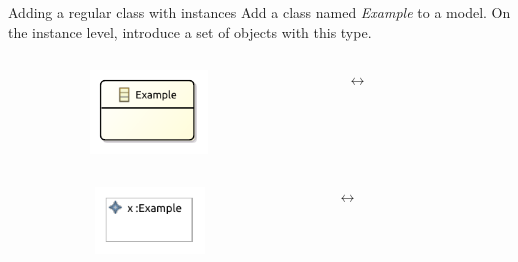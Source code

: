 \begin{frame}{Adding a regular class with instances}
Add a class named \textit{Example} to a model. On the instance level, introduce a set of objects with this type.
\begin{columns}[c]
    \begin{column}{0.05\textwidth}
    \end{column}\begin{column}{0.45\textwidth}
        \centering
        \includegraphics[width=0.5\textwidth]{images/04_library_of_transformations/class_type.pdf}
    \end{column}\begin{column}{0.05\textwidth}
        \centering
        $\leftrightarrow$
    \end{column}\begin{column}{0.45\textwidth}
        \centering
        
    \end{column}
\end{columns}
\begin{columns}[c]
    \begin{column}{0.05\textwidth}
    \end{column}\begin{column}{0.45\textwidth}
        \centering
        \includegraphics[width=0.5\textwidth]{images/04_library_of_transformations/class_instance.pdf}
    \end{column}\begin{column}{0.05\textwidth}
        \centering
        $\leftrightarrow$
    \end{column}\begin{column}{0.45\textwidth}
        \centering
        
    \end{column}
\end{columns}
\end{frame}

